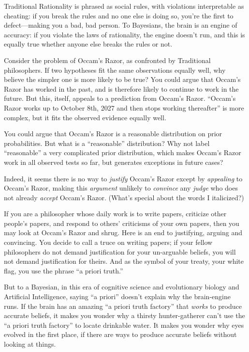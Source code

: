 {
 Traditional Rationality is phrased as social rules, with
violations interpretable as cheating: if you break the rules and no one
else is doing so, you're the first to defect---making
you a bad, bad person. To Bayesians, the brain is an engine of
accuracy: if you violate the laws of rationality, the engine
doesn't run, and this is equally true whether anyone
else breaks the rules or not. }

{
 Consider the problem of Occam's Razor, as
confronted by Traditional philosophers. If two hypotheses fit the same
observations equally well, why believe the simpler one is more likely
to be true? You could argue that Occam's Razor has
worked in the past, and is therefore likely to continue to work in the
future. But this, itself, appeals to a prediction from
Occam's Razor.
``Occam's Razor works up to October
8th, 2027 and then stops working thereafter'' is more
complex, but it fits the observed evidence equally well.}

{
 You could argue that Occam's Razor is a reasonable
distribution on prior probabilities. But what is a
``reasonable'' distribution? Why not
label ``reasonable'' a very
complicated prior distribution, which makes Occam's
Razor work in all observed tests so far, but generates exceptions in
future cases?}

{
 Indeed, it seems there is no way to \textit{justify}
Occam's Razor except by \textit{appealing} to
Occam's Razor, making this \textit{argument} unlikely
to \textit{convince} any \textit{judge} who does not already
\textit{accept} Occam's Razor. (What's
special about the words I italicized?)}

{
 If you are a philosopher whose daily work is to write papers,
criticize other people's papers, and respond to
others' criticisms of your own papers, then you may
look at Occam's Razor and shrug. Here is an end to
justifying, arguing and convincing. You decide to call a truce on
writing papers; if your fellow philosophers do not demand justification
for your un-arguable beliefs, you will not demand justification for
theirs. And as the symbol of your treaty, your white flag, you use the
phrase ``a priori truth.''}

{
 But to a Bayesian, in this era of cognitive science and
evolutionary biology and Artificial Intelligence, saying
``a priori'' doesn't
explain why the brain-engine runs. If the brain has an amazing
``a priori truth factory'' that
\textit{works} to produce accurate beliefs, it makes you wonder why a
thirsty hunter-gatherer can't use the
``a priori truth factory'' to locate
drinkable water. It makes you wonder why eyes evolved in the first
place, if there are ways to produce accurate beliefs without looking at
things.}

